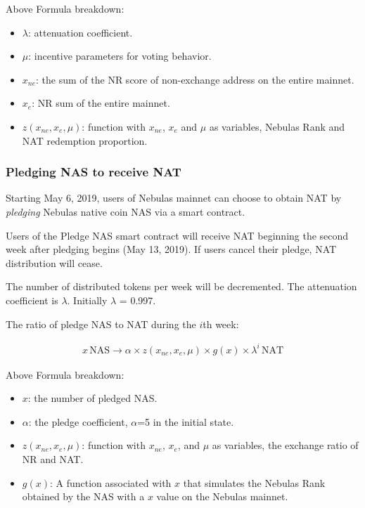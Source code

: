 Above Formula breakdown:

\begin{itemize}
	\item $\lambda$: attenuation coefficient.
	\item $\mu$: incentive parameters for voting behavior.
	\item $x_{ne}$: the sum of the NR score of non-exchange address on the entire mainnet.
	\item $x_{e}$: NR sum of the entire mainnet.
	\item $z(x_{ne},x_{e},\mu)$: function with $x_{ne}$, $x_{e}$ and $\mu$ as variables, Nebulas Rank and NAT redemption proportion.
\end{itemize}

\subsubsection{Pledging NAS to receive NAT}

Starting May 6, 2019, users of Nebulas mainnet can choose to obtain NAT by
\emph{pledging} Nebulas native coin NAS via a smart contract.

Users of the Pledge NAS smart contract will receive NAT beginning the second week after pledging begins (May 13, 2019). If users cancel their pledge, NAT distribution will cease.

The number of distributed tokens per week will be decremented. The attenuation coefficient is $\lambda$. Initially $\lambda$ = 0.997.

The ratio of pledge NAS to NAT during the $i$th week:

\begin{align}
x\,\text{NAS} \rightarrow \alpha \times z(x_{ne},x_{e},\mu)\times g(x) \times
  \lambda^{i}\,\text{NAT}
\end{align}

Above Formula breakdown:

\begin{itemize}
	\item $x$: the number of pledged NAS.
	\item $\alpha$: the pledge coefficient, $\alpha$=5 in the initial state.
	\item $z(x_{ne},x_{e},\mu)$: function with $x_{ne}$, $x_{e}$, and $\mu$ as variables, the exchange ratio of NR and NAT.
	\item $g(x)$: A function associated with $x$ that simulates the Nebulas Rank obtained by the NAS with a $x$ value on the Nebulas mainnet.
\end{itemize}

